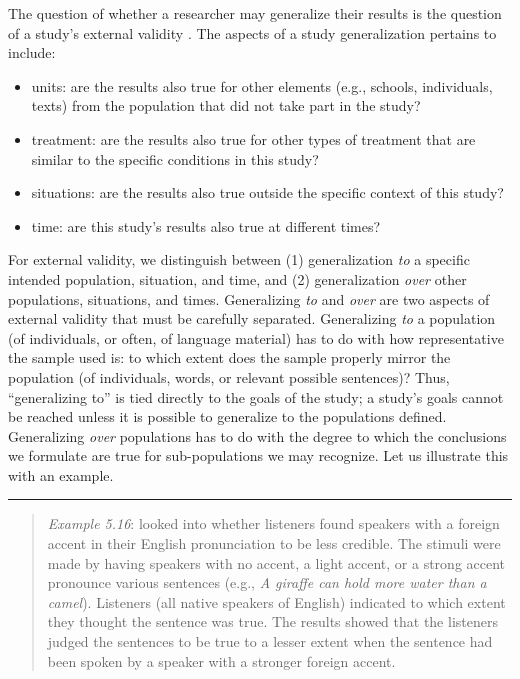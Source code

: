 \documentclass[
]{book}
\begin{document}
The question of whether a researcher may generalize their results is the question of a study's external validity \citep{SCC02}. The aspects of a study generalization pertains to include:

\begin{itemize}
\item
  units: are the results also true for other elements (e.g., schools, individuals, texts) from the population that did not take part in the study?
\item
  treatment: are the results also true for other types of treatment that are similar to the specific conditions in this study?
\item
  situations: are the results also true outside the specific context of this study?
\item
  time: are this study's results also true at different times?
\end{itemize}

For external validity, we distinguish between (1) generalization \emph{to} a specific intended population, situation, and time, and (2) generalization \emph{over} other populations, situations, and times. Generalizing \emph{to} and \emph{over} are two aspects of external validity that must be carefully separated. Generalizing \emph{to} a population (of individuals, or often, of language material) has to do with how representative the sample used is: to which extent does the sample properly mirror the population (of individuals, words, or relevant possible sentences)? Thus, ``generalizing to'' is tied directly to the goals of the study; a study's goals cannot be reached unless it is possible to generalize to the populations defined. Generalizing \emph{over} populations has to do with the degree to which the conclusions we formulate are true for sub-populations we may recognize. Let us illustrate this with an example.

\begin{center}\rule{0.5\linewidth}{0.5pt}\end{center}

\begin{quote}
\emph{Example 5.16}: \citet{LevA10} looked into whether listeners found speakers with a foreign accent in their English pronunciation to be less credible. The stimuli were made by having speakers with no accent, a light accent, or a strong accent pronounce various sentences (e.g., \emph{A giraffe can hold more water than a camel}). Listeners (all native speakers of English) indicated to which extent they thought the sentence was true. The results showed that the listeners judged the sentences to be true to a lesser extent when the sentence had been spoken by a speaker with a stronger foreign accent.
\end{quote}
\end{document}
